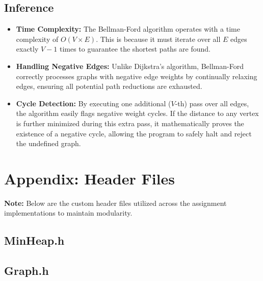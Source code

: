 \documentclass[a4paper,12pt]{article}
\begin{document}
\subsection*{Inference}
\begin{itemize}
    \item \textbf{Time Complexity:} The Bellman-Ford algorithm operates with a time complexity of $O(V \times E)$. This is because it must iterate over all $E$ edges exactly $V-1$ times to guarantee the shortest paths are found.
    \item \textbf{Handling Negative Edges:} Unlike Dijkstra's algorithm, Bellman-Ford correctly processes graphs with negative edge weights by continually relaxing edges, ensuring all potential path reductions are exhausted.
    \item \textbf{Cycle Detection:} By executing one additional ($V$-th) pass over all edges, the algorithm easily flags negative weight cycles. If the distance to any vertex is further minimized during this extra pass, it mathematically proves the existence of a negative cycle, allowing the program to safely halt and reject the undefined graph.
\end{itemize}

\newpage

\section*{Appendix: Header Files}
\textbf{Note:} Below are the custom header files utilized across the assignment implementations to maintain modularity.

\subsection*{MinHeap.h}


\newpage
\subsection*{Graph.h}

\end{document}
